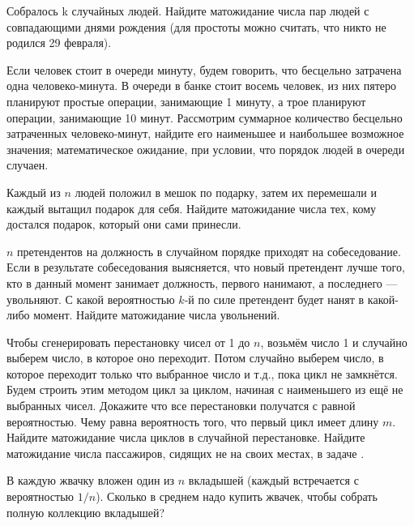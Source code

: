 \documentclass[a4paper,12pt]{article}
\begin{document}
Собралось k случайных людей. Найдите матожидание числа пар людей с совпадающими днями рождения (для простоты можно считать, что никто не родился 29 февраля).

Если человек стоит в очереди минуту, будем говорить, что бесцельно затрачена одна человеко-минута. В очереди в банке стоит восемь человек, из них пятеро планируют простые операции, занимающие 1 минуту, а трое планируют операции, занимающие 10 минут. 
Рассмотрим суммарное количество бесцельно затраченных человеко-минут, найдите его
 наименьшее и наибольшее возможное значения;
 математическое ожидание, при условии, что порядок людей в очереди случаен.

Каждый из $n$ людей положил в мешок по подарку, затем их перемешали и каждый вытащил подарок для себя. Найдите матожидание числа тех, кому достался подарок, который они сами принесли.

$n$ претендентов на должность в случайном порядке приходят на собеседование. 
Если в результате собеседования выясняется, что новый претендент лучше того, кто в данный момент занимает должность, первого нанимают, а последнего --- увольняют.
 С какой вероятностью $k$-й по силе претендент будет нанят в какой-либо момент.
 Найдите матожидание числа увольнений.

Чтобы сгенерировать перестановку чисел от 1 до $n$, возьмём число 1 и случайно выберем число, в которое оно переходит. Потом случайно выберем число, в которое переходит только что выбранное число и т.д., пока цикл не замкнётся. Будем строить этим методом цикл за циклом, начиная с наименьшего из ещё не выбранных чисел.
 Докажите что все перестановки получатся с равной вероятностью.
 Чему равна вероятность того, что первый цикл имеет длину $m$.
 Найдите матожидание числа циклов в случайной перестановке.
 Найдите матожидание числа пассажиров, сидящих не на своих местах, в задаче  .

В каждую жвачку вложен один из $n$ вкладышей (каждый встречается с вероятностью $1/n$).
Сколько в среднем надо купить жвачек, чтобы собрать полную коллекцию вкладышей?



\end{document}
